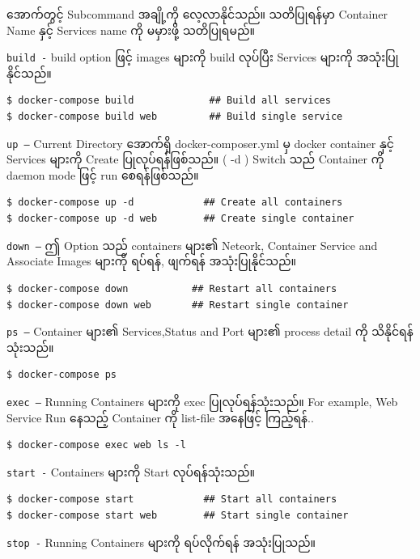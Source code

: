 အောက်တွင့် Subcommand အချို့ကို လေ့လာနိုင်သည်။ သတိပြုရန်မှာ Container
Name နှင့် Services name ကို မမှားဖို့ သတိပြုရမည်။

\texttt{build\ -} build option ဖြင့် images များကို build လုပ်ပြီး
Services များကို အသုံးပြုနိုင်သည်။

\begin{verbatim}
$ docker-compose build             ## Build all services
$ docker-compose build web         ## Build single service
\end{verbatim}

\texttt{up\ –} Current Directory အောက်ရှိ docker-composer.yml မှ docker
container နှင့် Services များကို Create ပြုလုပ်ရန်ဖြစ်သည်။ ( -d ) Switch
သည် Container ကို daemon mode ဖြင့် run စေရန်ဖြစ်သည်။

\begin{verbatim}
$ docker-compose up -d            ## Create all containers
$ docker-compose up -d web        ## Create single container
\end{verbatim}

\texttt{down\ –} ဤ Option သည် containers များ၏ Neteork, Container
Service and Associate Images များကို ရပ်ရန်, ဖျက်ရန် အသုံးပြုနိုင်သည်။

\begin{verbatim}
$ docker-compose down           ## Restart all containers
$ docker-compose down web       ## Restart single container
\end{verbatim}

\texttt{ps\ –} Container များ၏ Services,Status and Port များ၏ process
detail ကို သိနိုင်ရန် သုံးသည်။

\begin{verbatim}
$ docker-compose ps
\end{verbatim}

\texttt{exec\ –} Running Containers များကို exec ပြုလုပ်ရန်သုံးသည်။ For
example, Web Service Run နေသည့် Container ကို list-file အနေဖြင့်
ကြည့်ရန်..

\begin{verbatim}
$ docker-compose exec web ls -l
\end{verbatim}

\texttt{start\ -} Containers များကို Start လုပ်ရန်သုံးသည်။

\begin{verbatim}
$ docker-compose start            ## Start all containers
$ docker-compose start web        ## Start single container
\end{verbatim}

\texttt{stop\ -} Running Containers များကို ရပ်လိုက်ရန် အသုံးပြုသည်။

